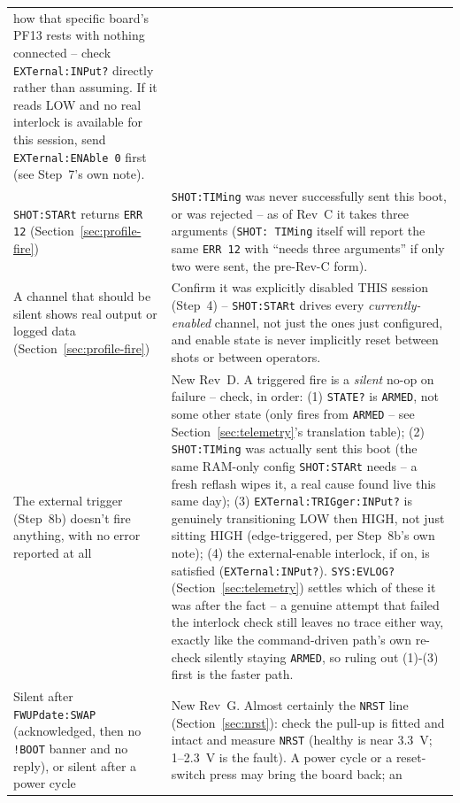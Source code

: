 \documentclass[11pt]{article}
\newcommand{\code}[1]{\texttt{#1}}
\begin{document}
\begin{longtable}{p{1.7in} p{3in}}
    how that specific board's PF13 rests with nothing connected --
    check \code{EXTernal:INPut?} directly rather than assuming. If it
    reads LOW and no real interlock is available for this session, send
    \code{EXTernal:ENAble 0} first (see Step~7's own note). \\
  \code{SHOT:STARt} returns \code{ERR 12}
    (Section~\ref{sec:profile-fire}) &
    \code{SHOT:TIMing} was never successfully sent this boot, or
    was rejected -- as of Rev~C it takes three arguments (\code{SHOT:
    TIMing} itself will report the same \code{ERR 12} with
    ``needs three arguments'' if only two were sent, the pre-Rev-C
    form). \\
  A channel that should be silent shows real output or logged data
    (Section~\ref{sec:profile-fire}) &
    Confirm it was explicitly disabled THIS session (Step~4) --
    \code{SHOT:STARt} drives every \emph{currently-enabled}
    channel, not just the ones just configured, and enable state is
    never implicitly reset between shots or between operators. \\
  The external trigger (Step~8b) doesn't fire anything, with no error
    reported at all &
    New Rev~D. A triggered fire is a \emph{silent} no-op on failure --
    check, in order: (1) \code{STATE?} is \code{ARMED}, not some other
    state (only fires from \code{ARMED} -- see
    Section~\ref{sec:telemetry}'s translation table); (2)
    \code{SHOT:TIMing} was actually sent this boot (the same
    RAM-only config \code{SHOT:STARt} needs -- a fresh reflash
    wipes it, a real cause found live this same day); (3)
    \code{EXTernal:TRIGger:INPut?} is genuinely transitioning LOW then
    HIGH, not just sitting HIGH (edge-triggered, per Step~8b's own
    note); (4) the external-enable interlock, if on, is satisfied
    (\code{EXTernal:INPut?}). \code{SYS:EVLOG?}
    (Section~\ref{sec:telemetry}) settles which of these it was after
    the fact -- a genuine attempt that failed the interlock check still
    leaves no trace either way, exactly like the command-driven path's
    own re-check silently staying \code{ARMED}, so ruling out (1)-(3)
    first is the faster path. \\
  Silent after \code{FWUPdate:SWAP} (acknowledged, then no
    \code{!BOOT} banner and no reply), or silent after a power cycle &
    New Rev~G. Almost certainly the \code{NRST} line
    (Section~\ref{sec:nrst}): check the pull-up is fitted and intact and
    measure \code{NRST} (healthy is near 3.3~V; 1--2.3~V is the fault).
    A power cycle or a reset-switch press may bring the board back; an

\end{longtable}
\end{document}
